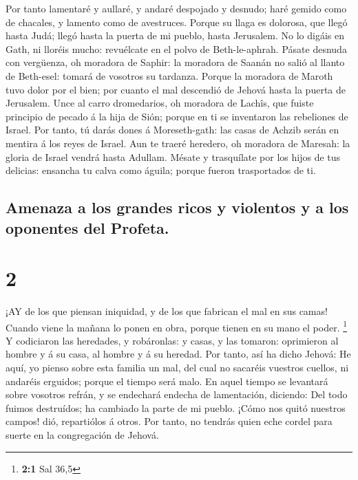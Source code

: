  Por tanto lamentaré y aullaré, y andaré despojado y
desnudo; haré gemido como de chacales, y lamento como de avestruces.
 Porque su llaga es dolorosa, que llegó hasta Judá; llegó
hasta la puerta de mi pueblo, hasta Jerusalem.  No lo
digáis en Gath, ni lloréis mucho: revuélcate en el polvo de
Beth-le-aphrah.  Pásate desnuda con vergüenza, oh moradora
de Saphir: la moradora de Saanán no salió al llanto de Beth-esel: tomará
de vosotros su tardanza.  Porque la moradora de Maroth tuvo
dolor por el bien; por cuanto el mal descendió de Jehová hasta la puerta
de Jerusalem.  Unce al carro dromedarios, oh moradora de
Lachîs, que fuiste principio de pecado á la hija de Sión; porque en ti
se inventaron las rebeliones de Israel.  Por tanto, tú
darás dones á Moreseth-gath: las casas de Achzib serán en mentira á los
reyes de Israel.  Aun te traeré heredero, oh moradora de
Maresah: la gloria de Israel vendrá hasta Adullam.  Mésate
y trasquílate por los hijos de tus delicias: ensancha tu calva como
águila; porque fueron trasportados de ti.

\hypertarget{amenaza-a-los-grandes-ricos-y-violentos-y-a-los-oponentes-del-profeta.}{%
\subsection{Amenaza a los grandes ricos y violentos y a los oponentes
del
Profeta.}\label{amenaza-a-los-grandes-ricos-y-violentos-y-a-los-oponentes-del-profeta.}}

\hypertarget{section-1}{%
\section{2}\label{section-1}}

 ¡AY de los que piensan iniquidad, y de los que fabrican el
mal en sus camas! Cuando viene la mañana lo ponen en obra, porque tienen
en su mano el poder. \footnote{\textbf{2:1} Sal 36,5}  Y
codiciaron las heredades, y robáronlas: y casas, y las tomaron:
oprimieron al hombre y á su casa, al hombre y á su heredad. 
Por tanto, así ha dicho Jehová: He aquí, yo pienso sobre esta familia un
mal, del cual no sacaréis vuestros cuellos, ni andaréis erguidos; porque
el tiempo será malo.  En aquel tiempo se levantará sobre
vosotros refrán, y se endechará endecha de lamentación, diciendo: Del
todo fuimos destruídos; ha cambiado la parte de mi pueblo. ¡Cómo nos
quitó nuestros campos! dió, repartiólos á otros.  Por tanto,
no tendrás quien eche cordel para suerte en la congregación de Jehová.

